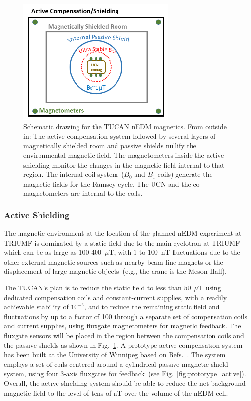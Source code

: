 \begin{figure}[h!]
  \centering
  \includegraphics[width=0.7\textwidth]{magneticscheme.png}
  \caption[Schematic of TUCAN's nEDM magnetics components]{Schematic
    drawing for the TUCAN nEDM magnetics. From outside in: The active
    compensation system followed by several layers of magnetically
    shielded room and passive shields nullify the environmental
    magnetic field. The magnetometers inside the active shielding
    monitor the changes in the magnetic field internal to that
    region. The internal coil system~($B_0$ and $B_1$ coils) generate
    the magnetic fields for the Ramsey cycle. The UCN and the
    co-magnetometers are internal to the coils.  }
  \label{fig:magneticscheme}
\end{figure}



\subsubsection{Active Shielding}

The magnetic environment at the location of the planned nEDM
experiment at TRIUMF is dominated by a static field due to the main
cyclotron at TRIUMF which can be as large as 100-400~$\mu$T, with 1 to
100~nT fluctuations due to the other external magnetic sources such as
nearby beam line magnets or the displacement of large magnetic
objects~(e.g., the crane is the Meson Hall).

The TUCAN's plan is to reduce the static field to less than 50~$\mu$T
using dedicated compensation coils and constant-current supplies, with
a readily achievable stability of $10^{-3}$, and to reduce the
remaining static field and fluctuations by up to a factor of 100
through a separate set of compensation coils and current supplies,
using fluxgate magnetometers for magnetic feedback. The fluxgate
sensors will be placed in the region between the compensation coils
and the passive shields as shown in Fig.~\ref{fig:magneticscheme}.  A
prototype active compensation system has been built at the University
of Winnipeg based on Refs.~\cite{beatrice,afach2014dynamic}. The
system employs a set of coils centered around a cylindrical passive
magnetic shield system, using four 3-axis fluxgates for feedback~(see
Fig.~\ref{fig:prototype_active}). Overall, the active shielding system
should be able to reduce the net background magnetic field to the
level of tens of nT over the volume of the nEDM cell.


